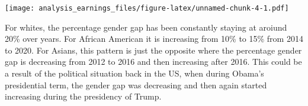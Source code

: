 \documentclass[
]{article}
\newenvironment{Shaded}{\begin{snugshade}}{\end{snugshade}}
\newcommand{\DataTypeTok}[1]{\textcolor[rgb]{0.13,0.29,0.53}{#1}}
\newcommand{\DecValTok}[1]{\textcolor[rgb]{0.00,0.00,0.81}{#1}}
\newcommand{\KeywordTok}[1]{\textcolor[rgb]{0.13,0.29,0.53}{\textbf{#1}}}
\newcommand{\NormalTok}[1]{#1}
\newcommand{\OperatorTok}[1]{\textcolor[rgb]{0.81,0.36,0.00}{\textbf{#1}}}
\newcommand{\OtherTok}[1]{\textcolor[rgb]{0.56,0.35,0.01}{#1}}
\newcommand{\StringTok}[1]{\textcolor[rgb]{0.31,0.60,0.02}{#1}}
\begin{document}
\begin{Shaded}
\end{Shaded}

\texttt{[image: analysis\_earnings\_files/figure-latex/unnamed-chunk-4-1.pdf]}

For whites, the percentage gender gap has been constantly staying at
aroiund 20\% over years. For African American it is increasing from 10\%
to 15\% from 2014 to 2020. For Asians, this pattern is just the opposite
where the percentage gender gap is decreasing from 2012 to 2016 and then
increasing after 2016. This could be a result of the political situation
back in the US, when during Obama's presidential term, the gender gap
was decreasing and then again started increasing during the presidency
of Trump.
\end{document}
